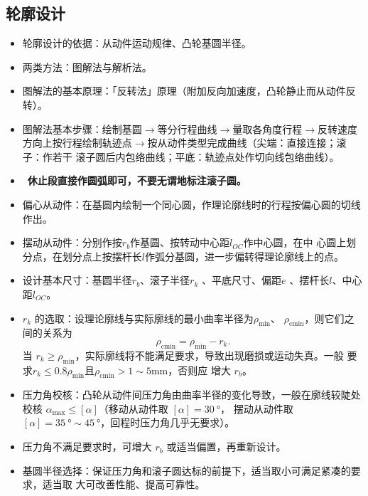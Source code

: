 \documentclass[12pt,a4paper]{article}
\newcommand{\tightlist}{\setlength{\parskip}{0pt}\setlength{\itemsep}{0pt}}
\newcommand{\hint}[1]{\textsf{（#1）}}
\newcommand{\minor}[1]{{\color{gray} #1}}
\newcommand{\then}{$\to$}
\renewcommand{\emph}[1]{\faIcon[regular]{lightbulb}\ \textbf{#1}}
\begin{document}
\subsection{轮廓设计}
\begin{itemize}\tightlist
    \item 轮廓设计的依据：从动件运动规律、凸轮基圆半径。
    \item \minor{两类方法：图解法与解析法。}
    \item 图解法的基本原理：「反转法」原理\hint{附加反向加速度，凸轮静止而从动件反转}。
    \item 图解法基本步骤：绘制基圆\then 等分行程曲线\then 量取各角度行程\then 反转速度
    方向上按行程绘制轨迹点\then 按从动件类型完成曲线\hint{尖端：直接连接；滚子：作若干
    滚子圆后内包络曲线；平底：轨迹点处作切向线包络曲线}。
    \item \emph{休止段直接作圆弧即可，不要无谓地标注滚子圆。}
    \item 偏心从动件：在基圆内绘制一个同心圆，作理论廓线时的行程按偏心圆的切线作出。
    \item \minor{摆动从动件：分别作按$r_b$作基圆、按转动中心距$l_{OC}$作中心圆，在中
    心圆上划分点，在划分点上按摆杆长$l$作弧分基圆，进一步偏转得理论廓线上的点。}
    \item 设计基本尺寸：基圆半径$r_b$、滚子半径$r_k$\minor{、平底尺寸}、偏距$e$\minor{
    、摆杆长$l$、中心距$l_{OC}$}。
    \item $r_k$ 的选取：设理论廓线与实际廓线的最小曲率半径为$\rho_\text{min}$、
    $\rho_\text{cmin}$，则它们之间的关系为
    \[ \rho_\text{cmin}=\rho_\text{min}-r_k. \]
    当 $r_k\geq\rho_\text{min}$，实际廓线将不能满足要求，导致出现磨损或运动失真。一般
    要求$r_k\leq0.8\rho_\text{min}$且$\rho_\text{cmin}>1\sim5\text{mm}$，否则应
    增大 $r_b$。
    \item 压力角校核：凸轮从动件间压力角由曲率半径的变化导致，一般在廓线较陡处校核
    $\alpha_\text{max}\leq[\alpha]$\hint{移动从动件取 $[\alpha]=\SI{30}\degree$，
    摆动从动件取 $[\alpha]=\SI{35}\degree\sim\SI{45}\degree$，回程时压力角几乎无要求}。
    \item 压力角不满足要求时，可增大 $r_b$ 或适当偏置，再重新设计。
    \item 基圆半径选择：保证压力角和滚子圆达标的前提下，适当取小可满足紧凑的要求，适当取
    大可改善性能、提高可靠性。
\end{itemize}
\end{document}
